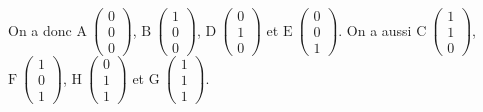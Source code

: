 \documentclass[10pt]{article}
\begin{document}
On a donc
$\mathrm{A}\:\begin{pmatrix}0 \\ 0 \\ 0 \end{pmatrix}$,
$\mathrm{B}\:\begin{pmatrix}1 \\ 0 \\ 0 \end{pmatrix}$,
$\mathrm{D}\:\begin{pmatrix}0 \\ 1 \\ 0 \end{pmatrix}$ et
$\mathrm{E}\:\begin{pmatrix}0 \\ 0 \\ 1 \end{pmatrix}$.
On a aussi
$\mathrm{C}\:\begin{pmatrix} 1 \\ 1 \\ 0 \end{pmatrix}$,
$\mathrm{F}\:\begin{pmatrix} 1 \\ 0 \\ 1 \end{pmatrix}$,
$\mathrm{H}\:\begin{pmatrix} 0 \\ 1 \\ 1 \end{pmatrix}$ et
$\mathrm{G}\:\begin{pmatrix} 1 \\ 1 \\ 1 \end{pmatrix}$.

\medskip
\end{document}
